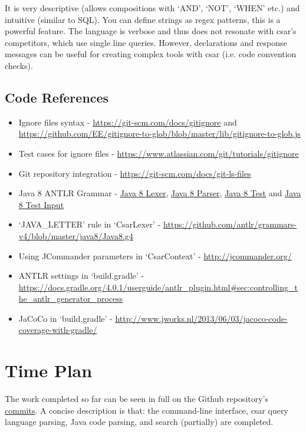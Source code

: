 \documentclass[12pt, letterpaper]{article}
\begin{document}
It is very descriptive (allows compositions with `AND', `NOT', `WHEN' etc.) and intuitive (similar to SQL). You can define strings as regex patterns, this is a powerful feature.
The language is verbose and thus does not resonate with csar's competitors, which use single line queries.
However, declarations and response messages can be useful for creating complex tools with csar (i.e. code convention checks).

\subsection{Code References}
\begin{itemize}
    \item Ignore files syntax - \url{https://git-scm.com/docs/gitignore} and \url{https://github.com/EE/gitignore-to-glob/blob/master/lib/gitignore-to-glob.js}
    \item Test cases for ignore files - \url{https://www.atlassian.com/git/tutorials/gitignore}
    \item Git repository integration - \url{https://git-scm.com/docs/git-ls-files}
    \item Java 8 ANTLR Grammar - \href{https://github.com/antlr/grammars-v4/blob/02711067f82bed8e0c8dfd25e80f4f8ae2472abd/java8-pt/JavaLexer.g4}{Java 8 Lexer}, \href{https://github.com/antlr/grammars-v4/blob/02711067f82bed8e0c8dfd25e80f4f8ae2472abd/java8-pt/JavaParser.g4}{Java 8 Parser}, \href{https://github.com/antlr/grammars-v4/blob/02711067f82bed8e0c8dfd25e80f4f8ae2472abd/_grammar-test/src/test/java/TestJava8pt.java}{Java 8 Test} and \href{https://github.com/antlr/grammars-v4/blob/02711067f82bed8e0c8dfd25e80f4f8ae2472abd/java8-pt/examples/AllInOne8.java}{Java 8 Test Input}
    \item `JAVA\_LETTER' rule in `CsarLexer' - \url{https://github.com/antlr/grammars-v4/blob/master/java8/Java8.g4}
    \item Using JCommander parameters in `CsarContext' - \url{http://jcommander.org/}
    \item ANTLR settings in `build.gradle' - \url{https://docs.gradle.org/4.0.1/userguide/antlr\_plugin.html\#sec:controlling\_the\_antlr\_generator\_process}
    \item JaCoCo in `build.gradle' - \url{http://www.jworks.nl/2013/06/03/jacoco-code-coverage-with-gradle/}
\end{itemize}

\section{Time Plan}
The work completed so far can be seen in full on the Github repository's \href{https://github.research.its.qmul.ac.uk/ec15116/csar/commits/master}{commits}.
A concise description is that: the command-line interface, csar query language parsing, Java code parsing, and search (partially) are completed.
\end{document}
